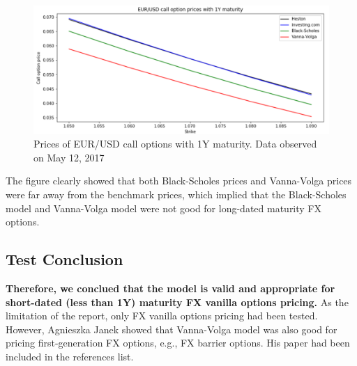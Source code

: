\begin{figure}[htb]
	\centering
	\includegraphics[scale=0.4]{./Testing-data/Python-codes/Python-4prices-1Y.png} 
	\caption{Prices of EUR/USD call options with 1Y maturity. Data observed on May 12, 2017}
	\label{fig:prices-1Y-MAY12} %
\end{figure}
\noindent
The figure clearly showed that both Black-Scholes prices and Vanna-Volga prices were far away from the benchmark prices, which implied that the Black-Scholes model and Vanna-Volga model were not good for long-dated maturity FX options.

\subsection{Test Conclusion}
\noindent
\textbf{Therefore, we conclued that the model is valid and appropriate for short-dated (less than 1Y) maturity FX vanilla options pricing.} As the limitation of the report, only FX vanilla options pricing had been tested. However, Agnieszka Janek showed that Vanna-Volga model was also good for pricing first-generation FX options, e.g., FX barrier options. His paper had been included in the references list.

